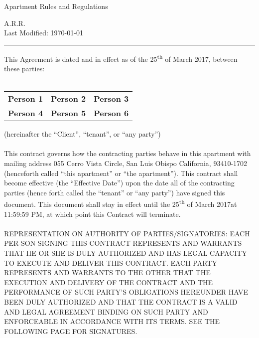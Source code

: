 \documentclass[10pt]{article}
\newcommand{\dateEffective}{25\textsuperscript {th} of March 2017}
\newcommand{\dateNullification}{25\textsuperscript {th} of March 2017}
\newcommand{\personOne}{Person 1}
\newcommand{\personTwo}{Person 2}
\newcommand{\personThree}{Person 3}
\newcommand{\personFour}{Person 4}
\newcommand{\personFive}{Person 5}
\newcommand{\personSix}{Person 6}
\begin{document}
	\begin{center}
		{\Large Apartment Rules and Regulations}
	\end{center}
\begin{center}
	
	{\normalsize  A.R.R.}\\
	Last Modified: \today
\end{center}
\hrule height .1mm

\vspace{.5cm}
\noindent This Agreement is dated and in effect as of the \dateEffective, between these parties:\\
\\
\begin{center}

\begin{tabu} to 0.8\textwidth {  X[l]  X[c]  X[r]  }
	{\bf \personOne} & {\bf \personTwo} & {\bf \personThree}\\
	{\bf {\bf \personFour}} & {\bf \personFive} & {\bf \personSix}\\
\end{tabu}


\end{center}
\noindent (hereinafter the ``Client'', ``tenant'', or ``any party'')\\ \\

\noindent This contract governs how the contracting parties behave in this apartment with mailing address 055 Cerro Vista Circle, San Luis Obispo California, 93410-1702 (henceforth called ``this apartment'' or ``the apartment''). This contract shall become effective (the ``Effective Date'') upon the date all of the contracting parties (hence forth called the ``tenant'' or ``any party'') have signed this document. This document shall stay in effect until the \dateNullification\space at 11:59:59 PM, at which point this Contract will terminate.
\\ \\
\noindent REPRESENTATION ON AUTHORITY OF PARTIES/SIGNATORIES: EACH PER-SON SIGNING THIS CONTRACT REPRESENTS AND WARRANTS THAT HE OR SHE IS DULY AUTHORIZED AND HAS LEGAL CAPACITY TO EXECUTE AND DELIVER THIS CONTRACT. EACH PARTY REPRESENTS AND WARRANTS TO THE OTHER THAT THE EXECUTION AND DELIVERY OF THE CONTRACT AND THE PERFORMANCE OF SUCH PARTY’S OBLIGATIONS HEREUNDER HAVE BEEN DULY AUTHORIZED AND THAT THE CONTRACT IS A VALID AND LEGAL AGREEMENT BINDING ON SUCH PARTY AND ENFORCEABLE IN ACCORDANCE WITH ITS TERMS. SEE THE FOLLOWING PAGE FOR SIGNATURES.
\end{document}
